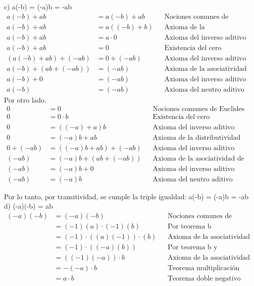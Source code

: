 \documentclass{article}
\begin{document}
c) \quad a(-b) = (-a)b = -ab \\
\begin{align*}
    a(-b) + ab &= a(-b) + ab && \text{Nociones comunes de Euclides} \\
    a(-b) + ab &= a((-b) + b) && \text{Axioma de la distributividad} \\
    a(-b) + ab &= a \cdot 0 && \text{Axioma del inverso aditivo} \\
    a(-b) + ab &= 0 && \text{Existencia del cero multiplicativo} \\
    (a(-b) + ab) + (-ab) &= 0 + (-ab) && \text{Axioma del inverso aditivo} \\
    a(-b) + (ab + (-ab)) &= (-ab) && \text{Axioma de la asociatividad de la adición y el neutro aditivo} \\
    a(-b) + 0 &= (-ab) && \text{Axioma del inverso aditivo} \\
    a(-b) &= (-ab) && \text{Axioma del neutro aditivo}
\end{align*}
Por otro lado.
\begin{align*}
    0 &= 0 && \text{Nociones comunes de Euclides} \\
    0 &= 0 \cdot b && \text{Existencia del cero multiplicativo} \\
    0 &= ((-a) + a)b && \text{Axioma del inverso aditivo} \\
    0 &= (-a)b + ab && \text{Axioma de la distributividad} \\
    0 + (-ab) &= ((-a)b + ab) + (-ab) && \text{Axioma del inverso aditivo} \\
    (-ab) &= (-a)b + (ab + (-ab)) && \text{Axioma de la asociatividad de la adición y el neutro aditivo} \\
    (-ab) &= (-a)b + 0 && \text{Axioma del inverso aditivo} \\
    (-ab) &= (-a)b && \text{Axioma del neutro aditivo}
\end{align*}

Por lo tanto, por transitividad, se cumple la triple igualdad: a(-b) = (-a)b = -ab\\

d) \quad (-a)(-b) = ab \\
\begin{align*}
    (-a)(-b) &= (-a)(-b) && \text{Nociones comunes de Euclides} \\
    &= (-1)(a) \cdot (-1)(b) && \text{Por teorema b} \\
    &= (-1) \cdot ((a)(-1)) \cdot (b) && \text{Axioma de la asociatividad de la multiplicación} \\
    &= (-1) \cdot ((-a)(b)) && \text{Por teorema b y asociatividad de la multiplicación} \\
    &= ((-1)(-a)) \cdot b && \text{Axioma de la asociatividad de la multiplicación} \\
    &= - (-a) \cdot b && \text{Teorema multiplicación negativa (teorema b)} \\
    &= a \cdot b && \text{Teorema doble negativo (teorema a)}
\end{align*}
\end{document}
